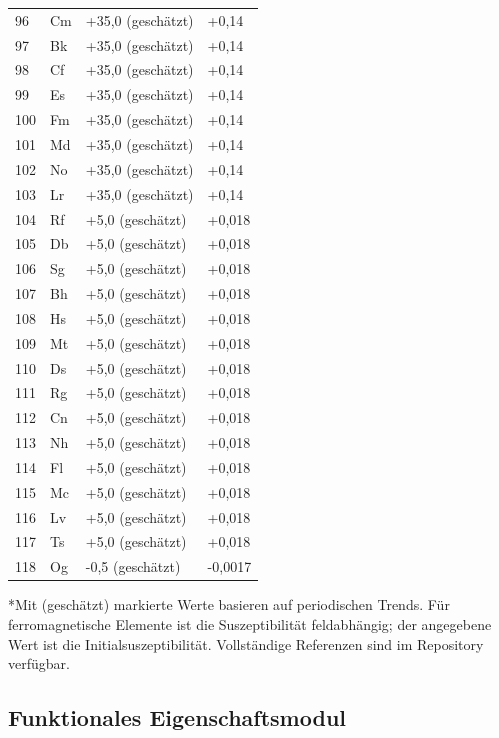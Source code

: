 \documentclass[12pt,a4paper]{article}
\begin{document}
\begin{longtable}{p{0.6cm}p{1.2cm}p{2.5cm}p{2.5cm}}
		96 & Cm & +35,0 (geschätzt) & +0,14 \\
		97 & Bk & +35,0 (geschätzt) & +0,14 \\
		98 & Cf & +35,0 (geschätzt) & +0,14 \\
		99 & Es & +35,0 (geschätzt) & +0,14 \\
		100& Fm & +35,0 (geschätzt) & +0,14 \\
		101& Md & +35,0 (geschätzt) & +0,14 \\
		102& No & +35,0 (geschätzt) & +0,14 \\
		103& Lr & +35,0 (geschätzt) & +0,14 \\
		104& Rf & +5,0 (geschätzt) & +0,018 \\
		105& Db & +5,0 (geschätzt) & +0,018 \\
		106& Sg & +5,0 (geschätzt) & +0,018 \\
		107& Bh & +5,0 (geschätzt) & +0,018 \\
		108& Hs & +5,0 (geschätzt) & +0,018 \\
		109& Mt & +5,0 (geschätzt) & +0,018 \\
		110& Ds & +5,0 (geschätzt) & +0,018 \\
		111& Rg & +5,0 (geschätzt) & +0,018 \\
		112& Cn & +5,0 (geschätzt) & +0,018 \\
		113& Nh & +5,0 (geschätzt) & +0,018 \\
		114& Fl & +5,0 (geschätzt) & +0,018 \\
		115& Mc & +5,0 (geschätzt) & +0,018 \\
		116& Lv & +5,0 (geschätzt) & +0,018 \\
		117& Ts & +5,0 (geschätzt) & +0,018 \\
		118& Og & -0,5 (geschätzt) & -0,0017 \\
		\bottomrule
	\end{longtable}
	*Mit (geschätzt) markierte Werte basieren auf periodischen Trends. Für ferromagnetische Elemente ist die Suszeptibilität feldabhängig; der angegebene Wert ist die Initialsuszeptibilität. Vollständige Referenzen sind im Repository verfügbar.
	
	
	\subsection{Funktionales Eigenschaftsmodul}
	\label{subsec:functional-properties}
	
\end{document}
